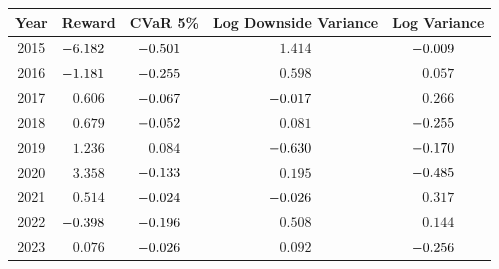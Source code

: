 \begingroup
\renewcommand{\arraystretch}{0.95}
\setlength{\tabcolsep}{6pt}
\begin{tabular}{@{}ccccc@{}}
\toprule
Year & Reward & CVaR 5\% & Log Downside Variance & Log Variance \\
\midrule
2015 & $\mathllap{-}6.182$\sym{***} & $\mathllap{-}0.501$\sym{***} & $1.414$\sym{***} & $\mathllap{-}0.009$ \\
2016 & $\mathllap{-}1.181$\sym{***} & $\mathllap{-}0.255$\sym{***} & $0.598$\sym{**} & $0.057$ \\
2017 & $0.606$ & $\mathllap{-}0.067$ & $\mathllap{-}0.017$ & $0.266$ \\
2018 & $0.679$ & $\mathllap{-}0.052$ & $0.081$ & $\mathllap{-}0.255$\sym{**} \\
2019 & $1.236$\sym{**} & $0.084$ & $\mathllap{-}0.630$\sym{*} & $\mathllap{-}0.170$ \\
2020 & $3.358$\sym{***} & $\mathllap{-}0.133$ & $0.195$ & $\mathllap{-}0.485$\sym{*} \\
2021 & $0.514$ & $\mathllap{-}0.024$ & $\mathllap{-}0.026$ & $0.317$\sym{**} \\
2022 & $\mathllap{-}0.398$ & $\mathllap{-}0.196$\sym{***} & $0.508$\sym{***} & $0.144$ \\
2023 & $0.076$ & $\mathllap{-}0.026$ & $0.092$ & $\mathllap{-}0.256$\sym{*} \\
\bottomrule
\end{tabular}
\endgroup
